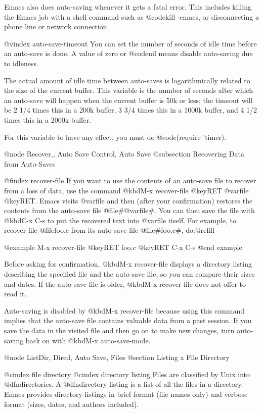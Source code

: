 {{{{{{{{{{{{{{{{{{{  Emacs also does auto-saving whenever it gets a fatal error.  This
includes killing the Emacs job with a shell command such as @code{kill
-emacs}, or disconnecting a phone line or network connection.

@vindex auto-save-timeout
You can set the number of seconds of idle time before an auto-save is
done.  A value of zero or @code{nil} means disable auto-saving due to
idleness.

The actual amount of idle time between auto-saves is logarithmically
related to the size of the current buffer.  This variable is the number
of seconds after which an auto-save will happen when the current buffer
is 50k or less; the timeout will be 2 1/4 times this in a 200k buffer, 3
3/4 times this in a 1000k buffer, and 4 1/2 times this in a 2000k
buffer.

For this variable to have any effect, you must do @code{(require 'timer)}.

@node Recover,, Auto Save Control, Auto Save
@subsection Recovering Data from Auto-Saves

@findex recover-file
  If you want to use the contents of an auto-save file to recover from a
loss of data, use the command @kbd{M-x recover-file @key{RET} @var{file}
@key{RET}}.  Emacs visits @var{file} and then (after your confirmation)
restores the contents from the auto-save file @file{#@var{file}#}.  You
can then save the file with @kbd{C-x C-s} to put the recovered text into
@var{file} itself.  For example, to recover file @file{foo.c} from its
auto-save file @file{#foo.c#}, do:@refill

@example
M-x recover-file @key{RET} foo.c @key{RET}
C-x C-s
@end example

  Before asking for confirmation, @kbd{M-x recover-file} displays a
directory listing describing the specified file and the auto-save file,
so you can compare their sizes and dates.  If the auto-save file
is older, @kbd{M-x recover-file} does not offer to read it.

  Auto-saving is disabled by @kbd{M-x recover-file} because using
this command implies that the auto-save file contains valuable data
from a past session.  If you save the data in the visited file and
then go on to make new changes, turn auto-saving back on
with @kbd{M-x auto-save-mode}.

@node ListDir, Dired, Auto Save, Files
@section Listing a File Directory

@cindex file directory
@cindex directory listing
  Files are classified by Unix into @dfn{directories}.  A @dfn{directory
listing} is a list of all the files in a directory.  Emacs provides
directory listings in brief format (file names only) and verbose format
(sizes, dates, and authors included).

}}}}}}}}}}}}}}}}}}}
